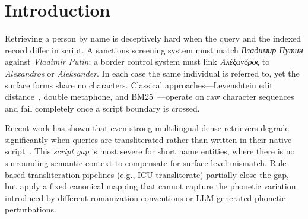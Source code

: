 \documentclass[sigconf]{acmart}
\begin{document}
\begin{abstract}
Retrieving person names across different writing systems is a fundamental challenge in multilingual
information retrieval: a query like ``Schwarzenegger'' should match its Arabic, Russian, or Chinese
phonetic equivalents, despite sharing no characters. Existing approaches based on edit distance or
phonetic hashing fail entirely once the script boundary is crossed.

We present a byte-level transformer encoder trained with InfoNCE contrastive loss and
Approximate Nearest Neighbour hard-negative mining. The model operates directly on raw UTF-8
bytes---requiring no tokeniser, no language-specific preprocessing, and no script detection.
We construct a dataset of 119,040 named entities with 4.67 million positive pairs spanning
8 non-Latin scripts (Arabic, Russian, Chinese, Japanese, Hebrew, Hindi, Greek, Korean), generated
via LLM-based phonetic transliteration.

Our model achieves 0.775 MRR and 0.897 R@10 overall, reducing the R@10 script gap---the
difference between Latin and non-Latin query performance---from 0.93 (edit-distance baselines)
to 0.096, a 10$\times$ reduction, while outperforming the strongest baseline (Transliterate,
0.565 MRR) by 37\%.
\end{abstract}

\maketitle

\section{Introduction}

Retrieving a person by name is deceptively hard when the query and the indexed record
differ in script. A sanctions screening system must match \textit{Владимир Путин} against
\textit{Vladimir Putin}; a border control system must link \textit{Αλέξανδρος} to
\textit{Alexandros} or \textit{Aleksander}. In each case the same individual is referred to,
yet the surface forms share no characters. Classical approaches---Levenshtein edit
distance~\cite{levenshtein1966binary,navarro2001guided}, double metaphone, and BM25~\cite{robertson2009bm25}---operate
on raw character sequences and fail completely once a script boundary is crossed.

Recent work has shown that even strong multilingual dense retrievers degrade significantly
when queries are transliterated rather than written in their native script~\cite{chari2025lost}.
This \textit{script gap} is most severe for short name entities, where there is no surrounding
semantic context to compensate for surface-level mismatch. Rule-based transliteration pipelines
(e.g., ICU transliterate) partially close the gap, but apply a fixed canonical mapping that cannot
capture the phonetic variation introduced by different romanization conventions or LLM-generated
phonetic perturbations.
\end{document}
